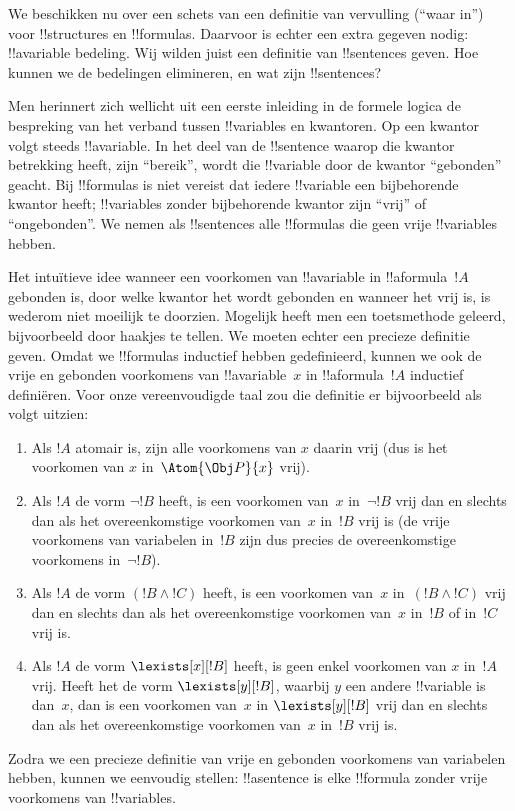 \documentclass[../../../include/open-logic-section]{subfiles}
\begin{document}


We beschikken nu over een schets van een definitie van vervulling
(``waar in'') voor !!{structure}s en !!{formula}s. Daarvoor is echter
een extra gegeven nodig: !!a{variable} bedeling. Wij wilden juist een
definitie van !!{sentence}s geven. Hoe kunnen we de bedelingen
elimineren, en wat zijn !!{sentence}s?

Men herinnert zich wellicht uit een eerste inleiding in de formele
logica de bespreking van het verband tussen !!{variable}s en
kwantoren. Op een kwantor volgt steeds !!a{variable}. In het deel van
de !!{sentence} waarop die kwantor betrekking heeft, zijn
``bereik'', wordt die !!{variable} door de kwantor ``gebonden''
geacht. Bij !!{formula}s is niet vereist dat iedere !!{variable} een
bijbehorende kwantor heeft; !!{variable}s zonder bijbehorende kwantor
zijn ``vrij'' of ``ongebonden''. We nemen als !!{sentence}s alle
!!{formula}s die geen vrije !!{variable}s hebben.

Het intuïtieve idee wanneer een voorkomen van !!a{variable} in
!!a{formula}~$!A$ gebonden is, door welke kwantor het wordt gebonden en
wanneer het vrij is, is wederom niet moeilijk te doorzien. Mogelijk
heeft men een toetsmethode geleerd, bijvoorbeeld door haakjes te
tellen. We moeten echter een precieze definitie geven. Omdat we
!!{formula}s inductief hebben gedefinieerd, kunnen we ook de vrije en
gebonden voorkomens van !!a{variable}~$x$ in !!a{formula}~$!A$
inductief definiëren. Voor onze vereenvoudigde taal zou die definitie
er bijvoorbeeld als volgt uitzien:
\begin{enumerate}
  \item Als $!A$ atomair is, zijn alle voorkomens van $x$ daarin vrij
  (dus is het voorkomen van $x$ in~$\Atom{\Obj P}{x}$ vrij).
  \item Als $!A$ de vorm $\lnot !B$ heeft, is een voorkomen van~$x$
  in~$\lnot !B$ vrij dan en slechts dan als het overeenkomstige
  voorkomen van~$x$ in~$!B$ vrij is (de vrije voorkomens van variabelen
  in~$!B$ zijn dus precies de overeenkomstige voorkomens in~$\lnot !B$).
  \item Als $!A$ de vorm $(!B \land !C)$ heeft, is een voorkomen van~$x$
  in~$(!B \land !C)$ vrij dan en slechts dan als het overeenkomstige
  voorkomen van~$x$ in~$!B$ of in~$!C$ vrij is.
  \item Als $!A$ de vorm $\lexists[x][!B]$ heeft, is geen enkel voorkomen
  van $x$ in~$!A$ vrij. Heeft het de vorm $\lexists[y][!B]$, waarbij
  $y$ een andere !!{variable} is dan~$x$, dan is een voorkomen van~$x$
  in $\lexists[y][!B]$ vrij dan en slechts dan als het overeenkomstige
  voorkomen van~$x$ in~$!B$ vrij is.
\end{enumerate}

Zodra we een precieze definitie van vrije en gebonden voorkomens van
variabelen hebben, kunnen we eenvoudig stellen: !!a{sentence} is elke
!!{formula} zonder vrije voorkomens van !!{variable}s.
\end{document}
